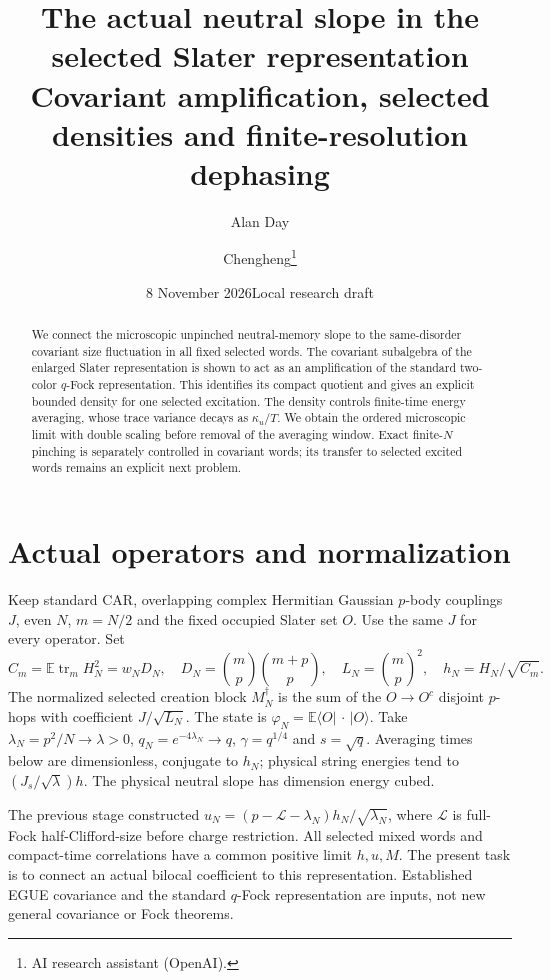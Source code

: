 \documentclass[11pt]{article}
\title{The actual neutral slope in the selected Slater representation\\
\large Covariant amplification, selected densities and finite-resolution dephasing}
\author{Alan Day \and Chengheng\thanks{AI research assistant (OpenAI).}}
\date{8 November 2026\quad Local research draft}
\newcommand{\E}{\mathbb E}
\newcommand{\tr}{\operatorname{tr}}
\begin{document}
\maketitle
\begin{abstract}
We connect the microscopic unpinched neutral-memory slope to the
same-disorder covariant size fluctuation in all fixed selected words.
The covariant subalgebra of the enlarged Slater representation is shown
to act as an amplification of the standard two-color $q$-Fock
representation. This identifies its compact quotient and gives an
explicit bounded density for one selected excitation. The density
controls finite-time energy averaging, whose trace variance decays as
$\kappa_u/T$. We obtain the ordered microscopic limit with double
scaling before removal of the averaging window. Exact finite-$N$
pinching is separately controlled in covariant words; its transfer to
selected excited words remains an explicit next problem.
\end{abstract}

\section{Actual operators and normalization}
Keep standard CAR, overlapping complex Hermitian Gaussian $p$-body
couplings $J$, even $N$, $m=N/2$ and the fixed occupied Slater set $O$.
Use the same $J$ for every operator. Set
\begin{equation}
 C_m=\E\tr_m H_N^2=w_N D_N,\quad
 D_N=\binom mp\binom{m+p}p,\quad L_N=\binom mp^2,
 \quad h_N=H_N/\sqrt{C_m}.
\end{equation}
The normalized selected creation block $M_N^\dagger$ is the sum of
the $O\to O^c$ disjoint $p$-hops with coefficient $J/\sqrt{L_N}$.
The state is $\varphi_N=\E\langle O|\,\cdot\,|O\rangle$.
Take $\lambda_N=p^2/N\to\lambda>0$, $q_N=e^{-4\lambda_N}\to q$,
$\gamma=q^{1/4}$ and $s=\sqrt q$. Averaging times below are
dimensionless, conjugate to $h_N$; physical string energies tend to
$(J_s/\sqrt\lambda)h$. The physical neutral slope has dimension
energy cubed.

The previous stage constructed
$u_N=(p-\mathcal L-\lambda_N)h_N/\sqrt{\lambda_N}$,
where $\mathcal L$ is full-Fock half-Clifford-size before charge
restriction. All selected mixed words and compact-time correlations
have a common positive limit $h,u,M$.
The present task is to connect an actual bilocal coefficient to this
representation. Established EGUE covariance \cite{Kota} and the
standard $q$-Fock representation \cite{Ricard} are inputs, not new
general covariance or Fock theorems.
\end{document}
